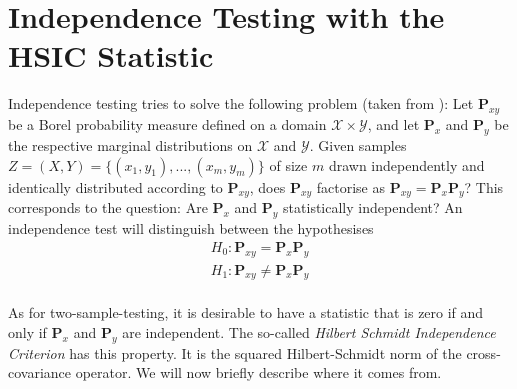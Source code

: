 %

\section{Independence Testing with the HSIC Statistic}
\label{sec:hsic_test}

Independence testing tries to solve the following problem (taken from \citep{Gretton2008d}):
Let $\textbf{P}_{xy}$ be a Borel probability measure defined on a domain $\mathcal{X}\times\mathcal{Y}$, and let $\textbf{P}_x$ and $\textbf{P}_y$ be the respective marginal distributions on $\mathcal{X}$ and $\mathcal{Y}$. Given samples $Z=(X,Y)=\{(x_1, y_1), ..., (x_m, y_m)\}$ of size $m$ drawn independently and identically distributed according to $\textbf{P}_{xy}$, does $\textbf{P}_{xy}$ factorise as $\textbf{P}_{xy}=\textbf{P}_x \textbf{P}_y$? This corresponds to the question: Are $\textbf{P}_x$ and $\textbf{P}_y$ statistically independent? An independence test will distinguish between the hypothesises
\begin{align*}
H_0: \textbf{P}_{xy}=\textbf{P}_x \textbf{P}_y\\
H_1: \textbf{P}_{xy}\neq\textbf{P}_x \textbf{P}_y\\
\end{align*}

As for two-sample-testing, it is desirable to have a statistic that is zero if and only if $\textbf{P}_x$ and $\textbf{P}_y$ are independent. The so-called \emph{Hilbert Schmidt Independence Criterion} has this property. It is the squared Hilbert-Schmidt norm of the cross-covariance operator. We will now briefly describe where it comes from.

